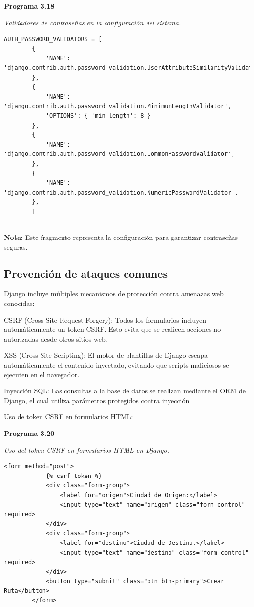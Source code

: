 	\textbf{Programa 3.18}
	
	\textit{Validadores de contraseñas en la configuración del sistema.} %
	\vspace{0.3cm} %
	\begin{lstlisting}[lineskip=-1pt]
		AUTH_PASSWORD_VALIDATORS = [
		{
			'NAME': 'django.contrib.auth.password_validation.UserAttributeSimilarityValidator',
		},
		{
			'NAME': 'django.contrib.auth.password_validation.MinimumLengthValidator',
			'OPTIONS': { 'min_length': 8 }
		},
		{
			'NAME': 'django.contrib.auth.password_validation.CommonPasswordValidator',
		},
		{
			'NAME': 'django.contrib.auth.password_validation.NumericPasswordValidator',
		},
		]
		
	\end{lstlisting}
	
	\textbf{Nota:} Este fragmento representa la configuración para garantizar contraseñas seguras.
	
\subsection{Prevención de ataques comunes}

	Django incluye múltiples mecanismos de protección contra amenazas web conocidas:
	
	CSRF (Cross-Site Request Forgery): Todos los formularios incluyen automáticamente un token CSRF. Esto evita que se realicen acciones no autorizadas desde otros sitios web.
	
	XSS (Cross-Site Scripting): El motor de plantillas de Django escapa automáticamente el contenido inyectado, evitando que scripts maliciosos se ejecuten en el navegador.
	
	Inyección SQL: Las consultas a la base de datos se realizan mediante el ORM de Django, el cual utiliza parámetros protegidos contra inyección.
	
	Uso de token CSRF en formularios HTML:

	\textbf{Programa 3.20}
	
	\textit{Uso del token CSRF en formularios HTML en Django.} %
	\vspace{0.3cm} %
	\begin{lstlisting}[lineskip=-1pt]
		<form method="post">
			{% csrf_token %}
			<div class="form-group">
				<label for="origen">Ciudad de Origen:</label>
				<input type="text" name="origen" class="form-control" required>
			</div>
			<div class="form-group">
				<label for="destino">Ciudad de Destino:</label>
				<input type="text" name="destino" class="form-control" required>
			</div>
			<button type="submit" class="btn btn-primary">Crear Ruta</button>
		</form>		
	\end{lstlisting}
	
